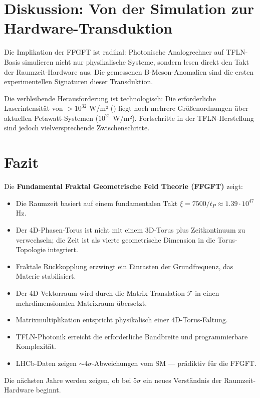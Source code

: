 	\section{Diskussion: Von der Simulation zur Hardware-Transduktion}
	
	Die Implikation der FFGFT ist radikal: Photonische Analogrechner auf TFLN-Basis simulieren nicht nur physikalische Systeme, sondern lesen direkt den Takt der Raumzeit-Hardware aus. Die gemessenen B-Meson-Anomalien sind die ersten experimentellen Signaturen dieser Transduktion.
	
	Die verbleibende Herausforderung ist technologisch: Die erforderliche Laserintensität von $>10^{32}$ W/m² (\cite{subPlanck2025}) liegt noch mehrere Größenordnungen über aktuellen Petawatt-Systemen ($10^{21}$ W/m²). Fortschritte in der TFLN-Herstellung sind jedoch vielversprechende Zwischenschritte.
	
	\section{Fazit}
	
	Die \textbf{Fundamental Fraktal Geometrische Feld Theorie (FFGFT)} zeigt:
	
	\begin{itemize}
		\item Die Raumzeit basiert auf einem fundamentalen Takt $\xi = 7500/t_P \approx 1.39 \cdot 10^{47}$ Hz.
		\item Der 4D-Phasen-Torus ist nicht mit einem 3D-Torus plus Zeitkontinuum zu verwechseln; die Zeit ist als vierte geometrische Dimension in die Torus-Topologie integriert.
		\item Fraktale Rückkopplung erzwingt ein Einrasten der Grundfrequenz, das Materie stabilisiert.
		\item Der 4D-Vektorraum wird durch die Matrix-Translation $\mathcal{T}$ in einen mehrdimensionalen Matrixraum übersetzt.
		\item Matrixmultiplikation entspricht physikalisch einer 4D-Torus-Faltung.
		\item TFLN-Photonik erreicht die erforderliche Bandbreite und programmierbare Komplexität.
		\item LHCb-Daten zeigen $\sim 4\sigma$-Abweichungen vom SM — prädiktiv für die FFGFT.
	\end{itemize}
	
	Die nächsten Jahre werden zeigen, ob bei $5\sigma$ ein neues Verständnis der Raumzeit-Hardware beginnt.
	
